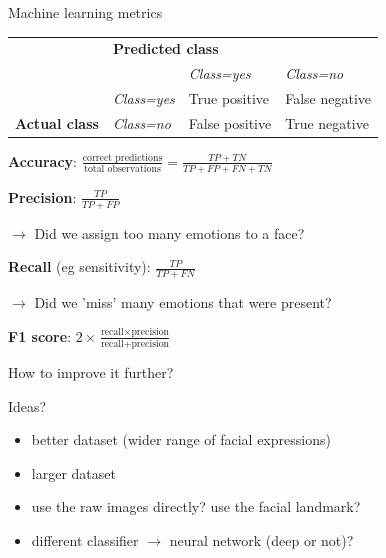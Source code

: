 \documentclass[compress,xcolor=table]{beamer}
\begin{document}
\begin{frame}{Machine learning metrics}

\begin{table}[]
\begin{tabular}{llll}
                      & \multicolumn{3}{l}{\textbf{Predicted class}} \\ \cline{2-4} 
\multicolumn{1}{l|}{} &         & \it Class=yes        & \it Class=no        \\ \cline{3-4} 
\multicolumn{1}{l|}{} &
  \multicolumn{1}{l|}{\it Class=yes} &
  \cellcolor[HTML]{9AFF99}True positive &
  \cellcolor[HTML]{FFCCC9}False negative \\
\multicolumn{1}{l|}{\multirow{-3}{*}{\textbf{Actual class}}} &
  \multicolumn{1}{l|}{\it Class=no} &
  \cellcolor[HTML]{FFCCC9}False positive &
  \cellcolor[HTML]{9AFF99}True negative
\end{tabular}
\end{table}


    \textbf{Accuracy}: $\frac{\text{correct predictions}}{\text{total
    observations}}=\frac{TP+TN}{TP+FP+FN+TN}$

    \textbf{Precision}: $\frac{TP}{TP+FP}$

        $\rightarrow$ Did we assign too many emotions to a face?

    \textbf{Recall} (eg sensitivity): $\frac{TP}{TP+FN}$

        $\rightarrow$ Did we 'miss' many emotions that were present?

    \textbf{F1 score}: $2\times\frac{\text{recall} \times
    \text{precision}}{\text{recall} + \text{precision}}$

\end{frame}

\begin{frame}{How to improve it further?}

    \begin{center}
        Ideas?
    \end{center}

    \pause

    \begin{itemize}
        \item better dataset (wider range of facial expressions)
        \item larger dataset
        \item use the raw images directly? use the facial landmark?
        \item different classifier $\rightarrow$ neural network (deep or not)?
    \end{itemize}

\end{frame}
\end{document}
